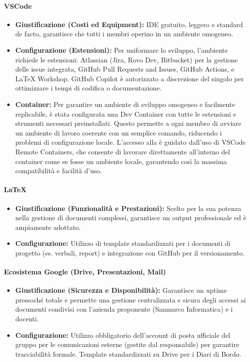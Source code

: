 \documentclass[a4paper,12pt]{article}
\begin{document}
\paragraph{VSCode} \label{vscode}
\begin{itemize}
    \item \textbf{Giustificazione (Costi ed Equipment):} IDE gratuito, leggero e standard de facto, garantisce che tutti i membri operino in un ambiente omogeneo.
    \item \textbf{Configurazione (Estensioni):} Per uniformare lo sviluppo, l'ambiente richiede le estensioni: Atlassian (Jira, Rovo Dev, Bitbucket) per la gestione delle issue integrata, GitHub Pull Requests and Issues, GitHub Actions, e LaTeX Workshop. GitHub Copilot è autorizzato a discrezione del singolo per ottimizzare i tempi di codifica o documentazione.
    \item \textbf{Container:} Per garantire un ambiente di sviluppo omogeneo e facilmente replicabile, è stata configurata una Dev Container con tutte le estensioni e strumenti necessari preinstallati. Questo permette a ogni membro di avviare un ambiente di lavoro coerente con un semplice comando, riducendo i problemi di configurazione locale. L'accesso alla è guidato dall'uso di VSCode Remote Containers, che consente di lavorare direttamente all'interno del container come se fosse un ambiente locale, garantendo così la massima compatibilità e facilità d'uso.
\end{itemize}

\paragraph{\LaTeX} \label{LaTeX}
\begin{itemize}
    \item \textbf{Giustificazione (Funzionalità e Prestazioni):} Scelto per la sua potenza nella gestione di documenti complessi, garantisce un output professionale ed è ampiamente adottato.
    \item \textbf{Configurazione:} Utilizzo di template standardizzati per i documenti di progetto (es. verbali, report) e integrazione con GitHub per il versionamento.
\end{itemize}

\paragraph{Ecosistema Google (Drive, Presentazioni, Mail)}
\begin{itemize}
    \item \textbf{Giustificazione (Sicurezza e Disponibilità):} Garantisce un uptime pressoché totale e permette una gestione centralizzata e sicura degli accessi ai documenti condivisi con l'azienda proponente (Sanmarco Informatica) e i docenti.
    \item \textbf{Configurazione:} Utilizzo obbligatorio dell'account di posta ufficiale del gruppo per le comunicazioni esterne (gestite dal responsabile) per garantire tracciabilità formale. Template standardizzati su Drive per i Diari di Bordo.
\end{itemize}
\end{document}
